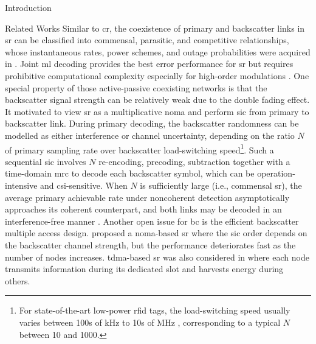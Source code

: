 \documentclass[journal]{IEEEtran}
\begin{document}
\begin{section}{Introduction}
	\begin{subsection}{Related Works}
		Similar to \gls{cr}, the coexistence of primary and backscatter links in \gls{sr} can be classified into commensal, parasitic, and competitive relationships, whose instantaneous rates, power schemes, and outage probabilities were acquired in \cite{Guo2019b,Ding2020}.
		Joint \gls{ml} decoding provides the best error performance for \gls{sr} but requires prohibitive computational complexity especially for high-order modulations \cite{Yang2018}.
		One special property of those active-passive coexisting networks is that the backscatter signal strength can be relatively weak due to the double fading effect.
		It motivated \cite{Long2020a,Liang2020,Guo2019b,Ding2020,Zhou2019a,Wu2021a,Xu2021a,Yang2021a,Yang2018,Han2021,Zhang2022} to view \gls{sr} as a multiplicative \gls{noma} and perform \gls{sic} from primary to backscatter link.
		During primary decoding, the backscatter randomness can be modelled as either interference or channel uncertainty, depending on the ratio $N$ of primary sampling rate over backscatter load-switching speed\footnote{For state-of-the-art low-power \gls{rfid} tags, the load-switching speed usually varies between \num{100}s of \unit{\kHz} to \num{10}s of \unit{\MHz} \cite{Torres2021}, corresponding to a typical $N$ between \num{10} and \num{1000}.}.
		Such a sequential \gls{sic} involves $N$ re-encoding, precoding, subtraction together with a time-domain \gls{mrc} to decode each backscatter symbol, which can be operation-intensive and \gls{csi}-sensitive.
		When $N$ is sufficiently large (i.e., commensal \gls{sr}), the average primary achievable rate under noncoherent detection asymptotically approaches its coherent counterpart, and both links may be decoded in an interference-free manner \cite{Long2020a}.
		Another open issue for \gls{bc} is the efficient backscatter multiple access design.
		\cite{Xu2021a} proposed a \gls{noma}-based \gls{sr} where the \gls{sic} order depends on the backscatter channel strength, but the performance deteriorates fast as the number of nodes increases.
		\gls{tdma}-based \gls{sr} was also considered in \cite{Yang2021a} where each node transmits information during its dedicated slot and harvests energy during others.

\end{subsection}
\end{section}
\end{document}
